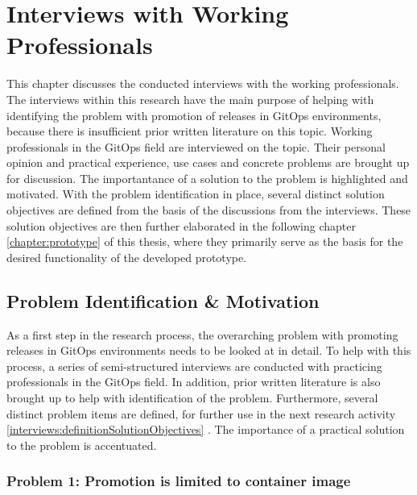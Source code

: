 

\chapter{Interviews with Working Professionals}

This chapter discusses the conducted interviews with the working professionals.
The interviews within this research have the main purpose of helping with
identifying the problem with promotion of releases in GitOps environments,
because there is insufficient prior written literature on this topic.
Working professionals in the GitOps field are interviewed on the topic.
Their personal opinion and practical experience, use cases and concrete problems
are brought up for discussion. The importantance of a solution to the
problem is highlighted and motivated.
With the problem identification in place, several distinct solution objectives
are defined from the basis of the discussions from the interviews.
These solution objectives are then further elaborated in the following chapter
\ref{chapter:prototype} 
of this thesis, where they primarily serve as the basis for the
desired functionality of the developed prototype.

\section{Problem Identification \& Motivation}
\label{interviews:problem-identification}

As a first step in the research process,
the overarching problem with promoting releases in GitOps environments
needs to be looked at in detail.
To help with this process, a series of semi-structured interviews are conducted with
practicing professionals in the GitOps field. In addition, prior written literature
is also brought up to help with identification of the problem.
Furthermore, several distinct problem items are defined,
for further use in the next research activity
\ref{interviews:definitionSolutionObjectives} .
The importance of a practical solution to the problem is accentuated.

\subsection{Problem 1: Promotion is limited to container image}
\label{problem1}

